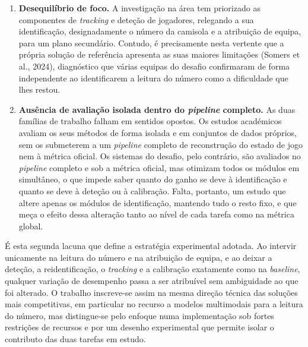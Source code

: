 \begin{enumerate}
\item \textbf{Desequilíbrio de foco.} A investigação na área tem priorizado as componentes de
\emph{tracking} e deteção de jogadores, relegando a sua identificação, designadamente o número
da camisola e a atribuição de equipa, para um plano secundário. Contudo, é precisamente nesta
vertente que a própria solução de referência apresenta as suas maiores limitações (Somers
et al., 2024), diagnóstico que várias equipas do desafio confirmaram de forma independente ao
identificarem a leitura do número como a dificuldade que lhes restou.

\item \textbf{Ausência de avaliação isolada dentro do \emph{pipeline} completo.} As duas
famílias de trabalho falham em sentidos opostos. Os estudos académicos avaliam os seus métodos
de forma isolada e em conjuntos de dados próprios, sem os submeterem a um \emph{pipeline}
completo de reconstrução do estado de jogo nem à métrica oficial. Os sistemas do desafio, pelo
contrário, são avaliados no \emph{pipeline} completo e sob a métrica oficial, mas otimizam
todos os módulos em simultâneo, o que impede saber quanto do ganho se deve à identificação e
quanto se deve à deteção ou à calibração. Falta, portanto, um estudo que altere apenas os
módulos de identificação, mantendo tudo o resto fixo, e que meça o efeito dessa alteração
tanto ao nível de cada tarefa como na métrica global.
\end{enumerate}

É esta segunda lacuna que define a estratégia experimental adotada. Ao intervir unicamente na
leitura do número e na atribuição de equipa, e ao deixar a deteção, a reidentificação, o
\emph{tracking} e a calibração exatamente como na \emph{baseline}, qualquer variação de
desempenho passa a ser atribuível sem ambiguidade ao que foi alterado. O trabalho inscreve-se
assim na mesma direção técnica das soluções mais competitivas, em particular no recurso a
modelos multimodais para a leitura do número, mas distingue-se pelo enfoque numa implementação
sob fortes restrições de recursos e por um desenho experimental que permite isolar o contributo
das duas tarefas em estudo.


%
%
